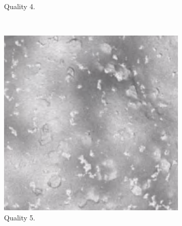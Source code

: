 \begin{figure}[htb]
\begin{center}
\begin{subfigure}[b]{0.47\textwidth}
\begin{center}
            \end{center}
            \caption{Quality 4.}
            \label{fig:img_quality_4}
        \end{subfigure}
        \\
        \begin{subfigure}[b]{0.47\textwidth}
            \begin{center}
                \includegraphics[width=\textwidth]{doc/thesis/0_figures/quality_compare/jp2_5_center.png}
            \end{center}
            \caption{Quality 5.}
            \label{fig:img_quality_5}
        \end{subfigure}
        \begin{subfigure}[b]{0.47\textwidth}
            \begin{center}

\end{center}
\end{subfigure}
\end{center}
\end{figure}
